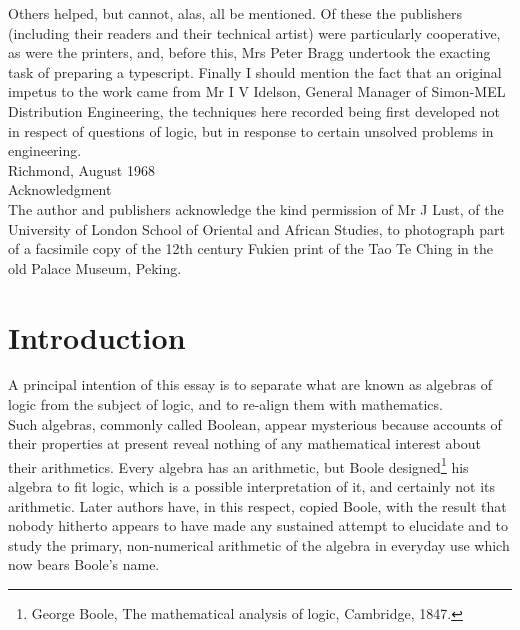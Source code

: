 \documentclass[a4paper]{article}
\theoremstyle{remark}
\begin{document}
Others  helped,  but  cannot,  alas,  all  be  mentioned.  Of  these  the  publishers  (including  their  readers and  their  technical  artist)  were  particularly  cooperative,  as  were  the  printers,  and,  before  this,  Mrs Peter Bragg  undertook  the  exacting  task  of  preparing  a  typescript.  Finally  I  should  mention  the  fact  that  an  original  impetus   to   the   work   came   from   Mr I V Idelson,   General   Manager   of  Simon-MEL   Distribution   Engineering,  the  techniques  here  recorded   being  first   developed   not   in  respect   of   questions  of  logic,  but  in  response  to certain  unsolved  problems  in  engineering. \\

Richmond, August 1968 \\

Acknowledgment \\

The author and publishers  acknowledge  the  kind  permission of Mr J Lust, of the University of London School of Oriental and African  Studies, to  photograph part of a facsimile copy of the 12th century Fukien print of the Tao Te Ching in the old Palace Museum, Peking. 

\newpage
\section*{Introduction}

A   principal   intention   of  this   essay   is  to   separate   what   are   known  as  algebras  of  logic  from  the  subject  of  logic,  and  to  re-align  them  with  mathematics.\\

Such  algebras,  commonly  called  Boolean,  appear  mysterious  because  accounts  of  their  properties  at  present  reveal  nothing  of   any   mathematical   interest   about   their  arithmetics.   Every   algebra  has  an  arithmetic,  but  Boole  designed\footnote{George  Boole,  The  mathematical     analysis   of  logic,   Cambridge,  1847.}  his  algebra  to  fit  logic,  which  is  a  possible  interpretation  of  it,  and  certainly  not  its  arithmetic.  Later  authors  have,  in  this  respect,  copied  Boole,  with  the  result  that  nobody  hitherto  appears  to   have   made any sustained attempt to elucidate and to study the primary, non-numerical  arithmetic  of  the  algebra  in  everyday  use  which  now  bears  Boole's  name.\\
\end{document}

